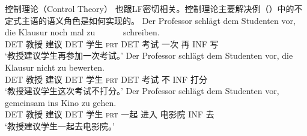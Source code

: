 控制理论（Control Theory） 也跟LF密切相关。控制理论主要解决例（）中的不定式主语的语义角色是如何实现的。
\eal
\ex 
\gll Der Professor schlägt dem Studenten vor, die Klausur noch mal zu~~~~~~ schreiben.\\
	 DET 教授 建议 DET 学生 \textsc{prt} DET 考试 一次 再 INF 写\\
\glt `教授建议学生再参加一次考试。'
\ex 
\gll Der Professor schlägt dem Studenten vor, die Klausur nicht zu bewerten.\\
	 DET 教授 建议 DET 学生 \textsc{prt} DET 考试 不 INF 打分\\
\glt `教授建议学生这次考试不打分。'
\ex 
\gll Der Professor schlägt dem Studenten vor, gemeinsam ins Kino zu gehen.\hspace{-3pt}\\
	 DET 教授 建议 DET 学生 \textsc{prt} 一起 进入 电影院 INF 去\\
\glt `教授建议学生一起去电影院。'
\zl
{}


